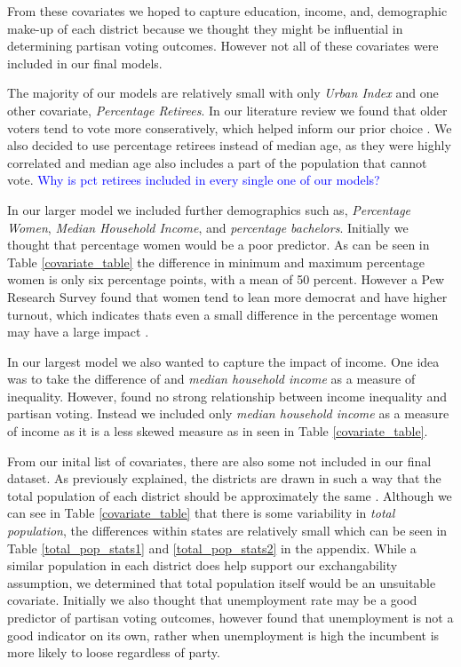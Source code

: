 \documentclass[12pt]{article}
\newcommand{\blue}[1]{\textcolor{blue}{#1}}
\begin{document}
From these covariates we hoped to capture education, income, and, demographic make-up of each district because we thought they might be influential in determining partisan voting outcomes. However not all of these covariates were included in our final models. 

The majority of our models are relatively small with only \textit{Urban Index} and one other covariate, \textit{Percentage Retirees}. In our literature review we found that older voters tend to vote more conseratively, which helped inform our prior choice \parencite{brown2022oldvoters}.  We also decided to use percentage retirees instead of median age, as they were highly correlated and median age also includes a part of the population that cannot vote. 
\blue{ Why is pct retirees included in every single one of our models? }

In our larger model we included further demographics such as, \textit{Percentage Women}, \textit{Median Household Income}, and \textit{percentage bachelors}. Initially we thought that percentage women would be a poor predictor. As can be seen in Table \ref{covariate_table} the difference in minimum and maximum percentage women is only six percentage points, with a mean of 50 percent. However a Pew Research Survey found that women tend to lean more democrat and have higher turnout, which indicates thats even a small difference in the percentage women may have a large impact \parencite{pew2020}. 

In our largest model we also wanted to capture the impact of income. One idea was to take the difference of  and \textit{median household income} as a measure of inequality. However, \cite{gelman2010income} found no strong relationship between income inequality and partisan voting. Instead we included only \textit{median household income} as a measure of income as it is a less skewed measure as in seen in Table \ref{covariate_table}.


From our inital list of covariates, there are also some not included in our final dataset. As previously explained, the districts are drawn in such a way that the total population of each district should be approximately the same \parencite{us_elections}. Although we can see in Table \ref{covariate_table} that there is some variability in \textit{total population}, the differences within states are relatively small which can be seen in Table \ref{total_pop_stats1} and \ref{total_pop_stats2} in the appendix. While a similar population in each district does help support our exchangability assumption, we determined that total population itself would be an unsuitable covariate. Initially we also thought that unemployment rate may be a good predictor of partisan voting outcomes, however \cite{park2020unemployment} found that unemployment is not a good indicator on its own, rather when unemployment is high the incumbent is more likely to loose regardless of party\parencite{park2020unemployment}. 
\end{document}
